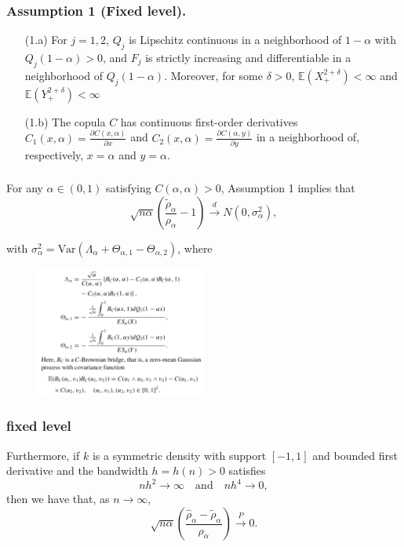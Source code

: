 \documentclass{beamer}
\newcommand{\suit}[1]{\left(#1\right)}
\begin{document}
\begin{frame}
    \frametitle{Assumption 1 (Fixed level).}
\begin{itemize}
    \item[(1.a)] For $j=1,2$, $Q_j$ is Lipschitz continuous in a neighborhood of $1-\alpha$ with $Q_j(1-\alpha)>0$, and $F_j$ is strictly
    increasing and differentiable in a neighborhood of $Q_j(1-\alpha)$. Moreover, for some $\delta>0$, $\mathbb{E}(X_{+}^{2+\delta})<\infty$ and $\mathbb{E}(Y_{+}^{2+\delta})<\infty$

    \bigskip

    \item[(1.b)] The copula $C$ has continuous first-order derivatives $C_1(x,\alpha)=\frac{\partial C(x,\alpha)}{\partial x}$ and $C_2(x,\alpha)=\frac{\partial C(\alpha,y)}{\partial y}$ in a neighborhood of, respectively, $x=\alpha$ and $y=\alpha$.
\end{itemize}
    

\end{frame}


\begin{frame}
    \frametitle{}
\begin{theorem}
    For any $\alpha \in (0,1)$ satisfying $C(\alpha,\alpha)>0$, Assumption 1 implies that 
    $$
        \sqrt{n\alpha}\suit{\frac{\tilde{\rho}_{\alpha}}{\rho_{\alpha}}-1}\stackrel{d}{\to} N(0,\sigma_{\alpha}^2),
    $$
\end{theorem}
with $\sigma_{\alpha}^2=\text{Var}(\Lambda_{\alpha}+\Theta_{\alpha,1}-\Theta_{\alpha,2})$, where
\begin{figure}
    \includegraphics[width=0.5\textwidth]{ps1.png}
\end{figure}

\end{frame}



\begin{frame}
    \frametitle{fixed level}
Furthermore, if $k$ is a symmetric density with support $[-1,1]$ and bounded first derivative and the bandwidth $h=h(n)>0$ satisfies
$$
nh^2\to \infty \quad \text{and} \quad nh^4\to 0,
$$
then we have that, as $n \to \infty$,
$$
\sqrt{n\alpha}\suit{\frac{\hat{\rho}_{\alpha}-\tilde{\rho}_{\alpha}}{\rho_{\alpha}}}\stackrel{P}{\to} 0.
$$

\end{frame}
\end{document}

